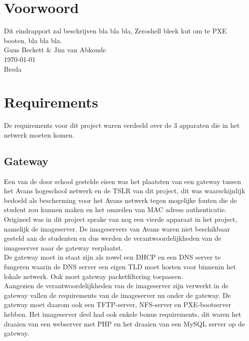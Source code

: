 \documentclass[12pt]{article}
\begin{document}
\clearpage
\section*{Voorwoord}
Dit eindrapport zal beschrijven bla bla bla, Zeroshell bleek kut om te PXE booten, bla bla bla.
\\
Guus Beckett \& Jim van Abkoude \\
\today \\
Breda
\newpage
\tableofcontents
\newpage
{}
\section{Requirements}
De requirements voor dit project waren verdeeld over de 3 apparaten die in het netwerk moeten komen.
\subsection{Gateway} %
\label{sub:gateway}
Een van de door school gestelde eisen was het plaatsten van een gateway tussen het Avans hogeschool netwerk en de TSLR van dit project, dit was waarschijnlijk bedoeld als bescherming voor het Avans netwerk tegen mogelijke fouten die de student zou kunnen maken en het omzeilen van MAC adress authenticatie. Origineel was in dit project sprake van nog een vierde apparaat in het project, namelijk de imageserver. De imageservers van Avans waren niet beschikbaar gesteld aan de studenten en dus werden de verantwoordelijkheden van de imageserver naar de gateway verplaatst.
\\De gateway moet in staat zijn als zowel een DHCP en een DNS server te fungeren waarin de DNS server een eigen TLD moet hosten voor binnenin het lokale netwerk. Ook moet gateway packetfiltering toepassen.
\\Aangezien de verantwoordelijkheden van de imageserver zijn verwerkt in de gateway vallen de requirements van de imageserver nu onder de gateway. De gateway moet daarom ook een TFTP-server, NFS-server en PXE-bootserver hebben. Het imageserver deel had ook enkele bonus requirements, dit waren het draaien van een webserver met PHP en het draaien van een MySQL server op de gateway.
\end{document}

